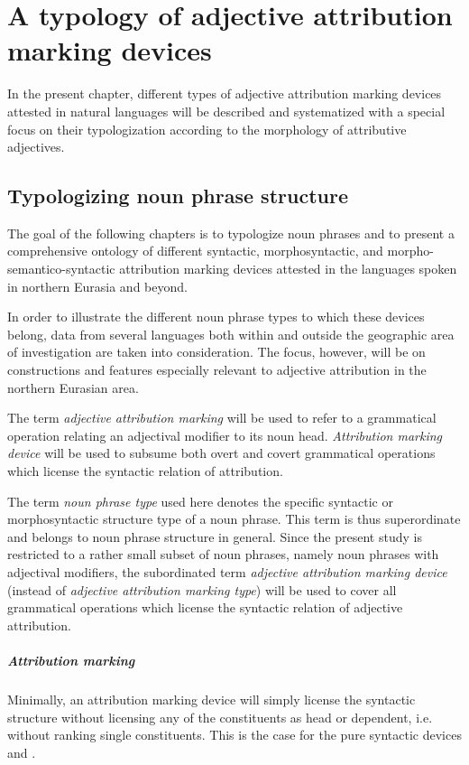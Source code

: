 
\chapter[Typology of attribution marking]{A typology of adjective attribution marking devices} \label{ontology}
In the present chapter, different types of adjective attribution marking devices attested in natural languages will be described and systematized with a special focus on their typologization according to the morphology of attributive adjectives.

\section{Typologizing noun phrase structure}
The goal of the following chapters is to typologize noun phrases and to present a comprehensive ontology of different syntactic, morphosyntactic, and morpho-semantico-syntactic attribution marking devices attested in the languages spoken in northern Eurasia and beyond. 

In order to illustrate the different noun phrase types to which these devices belong, data from several languages both within and outside the geographic area of investigation are taken into consideration. The focus, however, will be on constructions and features especially relevant to adjective attribution in the northern Eurasian area.

The term \emph{adjective attribution marking} will be used to refer to a grammatical operation relating an adjectival modifier to its noun head. \emph{Attribution marking device} will be used to subsume both overt and covert grammatical operations which license the syntactic relation of attribution. 

The term \emph{noun phrase type} used here denotes the specific syntactic or morphosyntactic structure type of a noun phrase. This term is thus superordinate and belongs to noun phrase structure in general. Since the present study is restricted to a rather small subset of noun phrases, namely noun phrases with adjectival modifiers, the subordinated term \emph{adjective attribution marking device} (instead of \emph{adjective attribution marking type}) will be used to cover all grammatical operations which license the syntactic relation of adjective attribution.

\paragraph{Attribution marking} Minimally, an attribution marking device will simply license the syntactic structure without licensing any of the constituents as head or dependent, i.e. without ranking single constituents. This is the case for the pure syntactic devices \emph{} and \emph{}.

